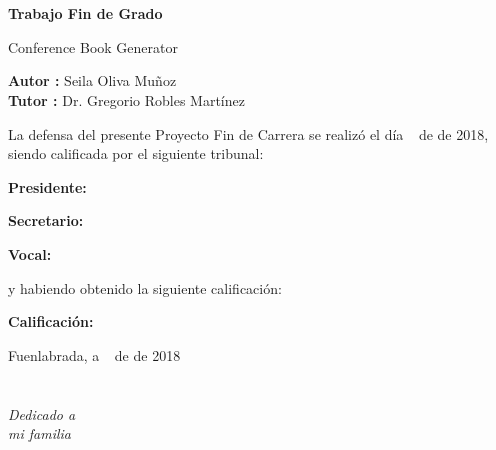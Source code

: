 \documentclass[a4paper, 12pt]{book}
\begin{document}
\newpage
\mbox{}
\thispagestyle{empty} %


\clearpage
{}
\chapter*{}

\vspace{-4cm}
\begin{center}
\LARGE
\textbf{Trabajo Fin de Grado}

\vspace{1cm}
\large
Conference Book Generator

\vspace{1cm}
\large
\textbf{Autor :} Seila Oliva Muñoz \\
\textbf{Tutor :} Dr. Gregorio Robles Martínez

\end{center}

\vspace{1cm}
La defensa del presente Proyecto Fin de Carrera se realizó el día \qquad$\;\,$ de \qquad\qquad\qquad\qquad \newline de 2018, siendo calificada por el siguiente tribunal:


\vspace{0.5cm}
\textbf{Presidente:}

\vspace{1.2cm}
\textbf{Secretario:}

\vspace{1.2cm}
\textbf{Vocal:}


\vspace{1.2cm}
y habiendo obtenido la siguiente calificación:

\vspace{1cm}
\textbf{Calificación:}


\vspace{1cm}
\begin{flushright}
Fuenlabrada, a \qquad$\;\,$ de \qquad\qquad\qquad\qquad de 2018
\end{flushright}


\chapter*{}
\begin{flushright}
\textit{Dedicado a \\
mi familia}
\end{flushright}
\end{document}
